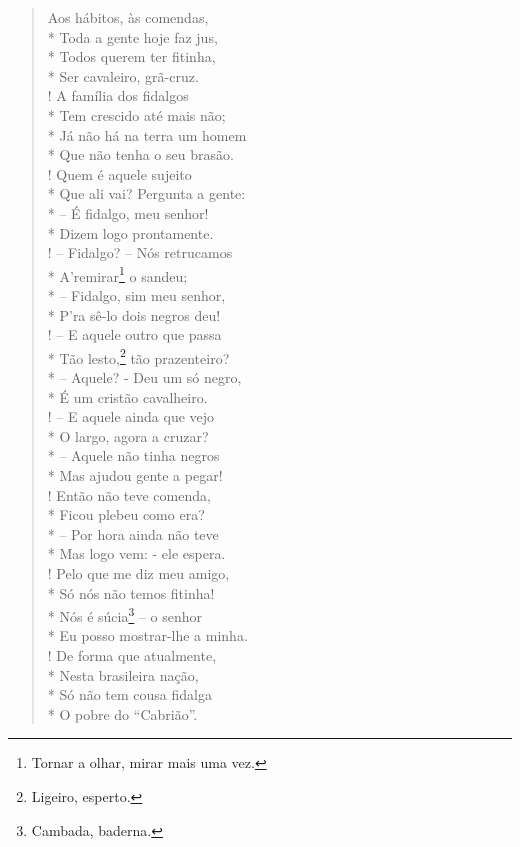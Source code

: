 \asterisc{}

\begin{verse}
Aos hábitos, às comendas,\\*
Toda a gente hoje faz jus,\\*
Todos querem ter fitinha,\\*
Ser cavaleiro, grã-cruz.\\!
A família dos fidalgos\\*
Tem crescido até mais não;\\*
Já não há na terra um homem\\*
Que não tenha o seu brasão.\\!
Quem é aquele sujeito\\*
Que ali vai? Pergunta a gente:\\*
-- É fidalgo, meu senhor!\\*
Dizem logo prontamente.\\!
-- Fidalgo? -- Nós retrucamos\\*
A'remirar\footnote{ Tornar a olhar, mirar mais uma vez.} o sandeu;\\*
-- Fidalgo, sim meu senhor,\\*
P'ra sê-lo dois negros deu!\\!
-- E aquele outro que passa\\*
Tão lesto,\footnote{ Ligeiro, esperto.} tão prazenteiro?\\*
-- Aquele? - Deu um só negro,\\*
É um cristão cavalheiro.\\!
-- E aquele ainda que vejo\\*
O largo, agora a cruzar?\\*
-- Aquele não tinha negros\\*
Mas ajudou gente a pegar!\\!
Então não teve comenda,\\*
Ficou plebeu como era?\\*
-- Por hora ainda não teve\\*
Mas logo vem: - ele espera.\\!
Pelo que me diz meu amigo,\\*
Só nós não temos fitinha!\\*
Nós é súcia\footnote{ Cambada, baderna.} -- o senhor\\*
Eu posso mostrar-lhe a minha.\\!
De forma que atualmente,\\*
Nesta brasileira nação,\\*
Só não tem cousa fidalga\\*
O pobre do ``Cabrião''.
\end{verse}

